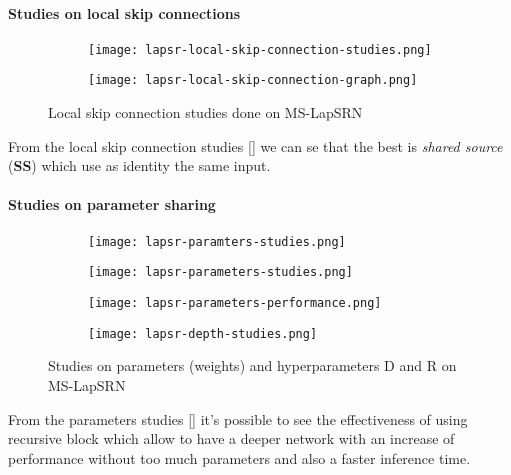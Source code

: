 \paragraph{Studies on local skip connections}
\begin{figure}
    \begin{subfigure}{0.49\textwidth}
        \centering
        \texttt{[image: lapsr-local-skip-connection-studies.png]}
    \end{subfigure}
    \begin{subfigure}{0.49\textwidth}
        \centering
        \texttt{[image: lapsr-local-skip-connection-graph.png]}
    \end{subfigure}
    \caption{Local skip connection studies done on MS-LapSRN}\label{lapsr:lsc-studies}
\end{figure}
From the local skip connection studies [] we can se that the best is \textit{shared source} (\textbf{SS}) which use as identity the same input.

\paragraph{Studies on parameter sharing}
\begin{figure}
    \begin{subfigure}{0.49\textwidth}
        \centering
        \texttt{[image: lapsr-paramters-studies.png]}
    \end{subfigure}
    \begin{subfigure}{0.49\textwidth}
        \centering
        \texttt{[image: lapsr-parameters-studies.png]}
    \end{subfigure}
    \begin{subfigure}{0.49\textwidth}
        \centering
        \texttt{[image: lapsr-parameters-performance.png]}
    \end{subfigure}
    \begin{subfigure}{0.49\textwidth}
        \centering
        \texttt{[image: lapsr-depth-studies.png]}
    \end{subfigure}
    \caption{Studies on parameters (weights) and hyperparameters D and R on MS-LapSRN}\label{lapsr:parameters-studies}
\end{figure}
From the parameters studies [] it's possible to see the effectiveness of using recursive block which allow to have a deeper network with an increase of performance without too much parameters and also a faster inference time.

